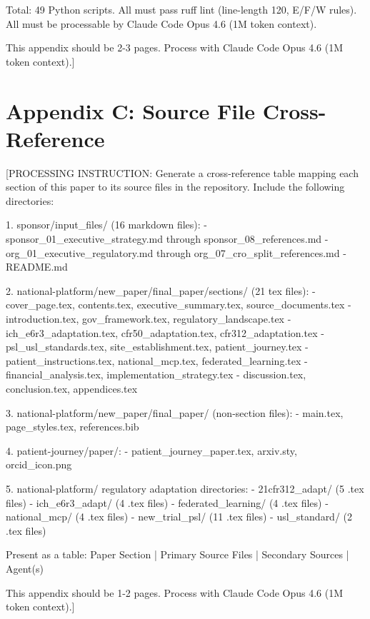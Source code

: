 Total: 49 Python scripts. All must pass ruff lint (line-length 120, E/F/W rules).
All must be processable by Claude Code Opus 4.6 (1M token context).

This appendix should be 2-3 pages. Process with Claude Code Opus 4.6 (1M token context).]

\section*{Appendix C: Source File Cross-Reference}

[PROCESSING INSTRUCTION: Generate a cross-reference table mapping each section of this
paper to its source files in the repository. Include the following directories:

1. sponsor/input\_files/ (16 markdown files):
   - sponsor\_01\_executive\_strategy.md through sponsor\_08\_references.md
   - org\_01\_executive\_regulatory.md through org\_07\_cro\_split\_references.md
   - README.md

2. national-platform/new\_paper/final\_paper/sections/ (21 tex files):
   - cover\_page.tex, contents.tex, executive\_summary.tex, source\_documents.tex
   - introduction.tex, gov\_framework.tex, regulatory\_landscape.tex
   - ich\_e6r3\_adaptation.tex, cfr50\_adaptation.tex, cfr312\_adaptation.tex
   - psl\_usl\_standards.tex, site\_establishment.tex, patient\_journey.tex
   - patient\_instructions.tex, national\_mcp.tex, federated\_learning.tex
   - financial\_analysis.tex, implementation\_strategy.tex
   - discussion.tex, conclusion.tex, appendices.tex

3. national-platform/new\_paper/final\_paper/ (non-section files):
   - main.tex, page\_styles.tex, references.bib

4. patient-journey/paper/:
   - patient\_journey\_paper.tex, arxiv.sty, orcid\_icon.png

5. national-platform/ regulatory adaptation directories:
   - 21cfr312\_adapt/ (5 .tex files)
   - ich\_e6r3\_adapt/ (4 .tex files)
   - federated\_learning/ (4 .tex files)
   - national\_mcp/ (4 .tex files)
   - new\_trial\_psl/ (11 .tex files)
   - usl\_standard/ (2 .tex files)

Present as a table: Paper Section | Primary Source Files | Secondary Sources | Agent(s)

This appendix should be 1-2 pages. Process with Claude Code Opus 4.6 (1M token context).]


